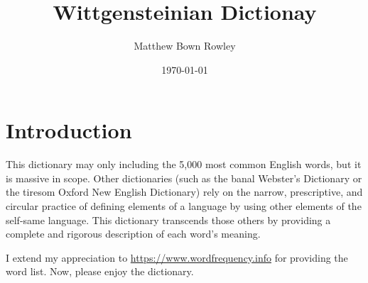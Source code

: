 \documentclass[12pt, letterpaper]{memoir}
\title{Wittgensteinian Dictionay}
\author{Matthew Bown Rowley}
\date{\today}
\begin{document}
\maketitle
\frontmatter
\chapter*{Introduction}
This dictionary may only including the 5,000 most common English words, but it
is massive in scope. Other dictionaries (such as the banal Webster's Dictionary
or the tiresom Oxford New English Dictionary) rely on the narrow, prescriptive,
and circular practice of defining elements of a language by using other
elements of the self-same language. This dictionary transcends those others by
providing a complete and rigorous description of each word's meaning.

I extend my appreciation to \hyperref[https://www.wordfrequency.info]{https://www.wordfrequency.info}
 for providing the word list. Now, please enjoy the dictionary.

\mainmatter
\end{document}
